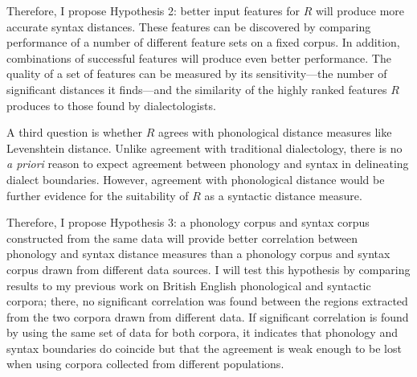 Therefore, I propose Hypothesis 2: better input features
for $R$ will produce more accurate syntax
distances. These features can be discovered by comparing performance
of a number of different feature sets on a fixed corpus. In addition,
combinations of successful features will produce even better
performance.
The quality of a set of features can be
measured by its sensitivity---the number of significant distances it
finds---and the similarity of the highly ranked features $R$ produces
to those found by dialectologists.

A third question is whether $R$ agrees with phonological distance
measures like Levenshtein distance. Unlike agreement with traditional
dialectology, there is no {\it a priori} reason to expect agreement
between phonology and syntax in delineating dialect
boundaries. However, agreement with phonological distance would be
further evidence for the suitability of $R$ as a syntactic distance
measure.

Therefore, I propose Hypothesis 3: a phonology corpus and syntax corpus
constructed from the same data will provide better correlation between
phonology and syntax distance measures than a phonology corpus and
syntax corpus drawn from different data sources. I will test this
hypothesis by comparing results to my previous work on British English
phonological and syntactic corpora; there, no significant correlation
was found between the regions extracted from the two corpora drawn
from different data. If significant correlation is found by using the
same set of data for both corpora, it indicates that phonology and
syntax boundaries do coincide but that the agreement is weak enough to
be lost when using corpora collected from different populations.

